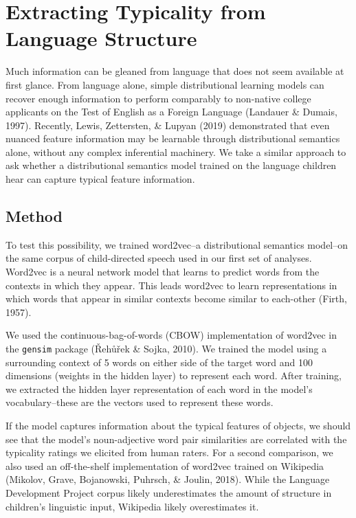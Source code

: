 \documentclass[10pt, letterpaper]{article}
\begin{document}
\hypertarget{extracting-typicality-from-language-structure}{%
\section{Extracting Typicality from Language
Structure}\label{extracting-typicality-from-language-structure}}

Much information can be gleaned from language that does not seem
available at first glance. From language alone, simple distributional
learning models can recover enough information to perform comparably to
non-native college applicants on the Test of English as a Foreign
Language (Landauer \& Dumais, 1997). Recently, Lewis, Zettersten, \&
Lupyan (2019) demonstrated that even nuanced feature information may be
learnable through distributional semantics alone, without any complex
inferential machinery. We take a similar approach to ask whether a
distributional semantics model trained on the language children hear can
capture typical feature information.

\hypertarget{method}{%
\subsection{Method}\label{method}}

To test this possibility, we trained word2vec--a distributional
semantics model--on the same corpus of child-directed speech used in our
first set of analyses. Word2vec is a neural network model that learns to
predict words from the contexts in which they appear. This leads
word2vec to learn representations in which words that appear in similar
contexts become similar to each-other (Firth, 1957).

We used the continuous-bag-of-words (CBOW) implementation of word2vec in
the \texttt{gensim} package (Řehůřek \& Sojka, 2010). We trained the
model using a surrounding context of 5 words on either side of the
target word and 100 dimensions (weights in the hidden layer) to
represent each word. After training, we extracted the hidden layer
representation of each word in the model's vocabulary--these are the
vectors used to represent these words.

If the model captures information about the typical features of objects,
we should see that the model's noun-adjective word pair similarities are
correlated with the typicality ratings we elicited from human raters.
For a second comparison, we also used an off-the-shelf implementation of
word2vec trained on Wikipedia (Mikolov, Grave, Bojanowski, Puhrsch, \&
Joulin, 2018). While the Language Development Project corpus likely
underestimates the amount of structure in children's linguistic input,
Wikipedia likely overestimates it.
\end{document}
